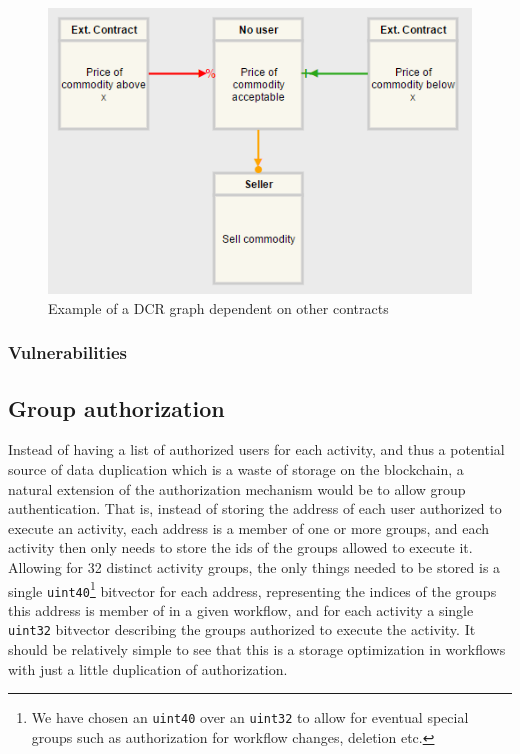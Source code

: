 \documentclass{article}
\begin{document}
			\begin{figure}[!ht]
			\centering
			\includegraphics{figures/external-contract-relations.png}
		 	\caption[External contract relations]
		 	{Example of a DCR graph dependent on other contracts}
		 	\label{fig:external-contract-relations}
			\end{figure}

		\subsubsection{Vulnerabilities}

		\subsection{Group authorization}
		Instead of having a list of authorized users for each activity, and thus a potential source of data duplication which is a waste of storage on the blockchain, a natural extension of the authorization mechanism would be to allow group authentication.
		That is, instead of storing the address of each user authorized to execute an activity, each address is a member of one or more groups, and each activity then only needs to store the ids of the groups allowed to execute it.   
		Allowing for 32 distinct activity groups, the only things needed to be stored is a single \texttt{uint40}\footnote{We have chosen an \texttt{uint40} over an \texttt{uint32} to allow for eventual special groups such as authorization for workflow changes, deletion etc.} bitvector for each address, representing the indices of the groups this address is member of in a given workflow, and for each activity a single \texttt{uint32} bitvector describing the groups authorized to execute the activity. 
		It should be relatively simple to see that this is a storage optimization in workflows with just a little duplication of authorization.
\end{document}
